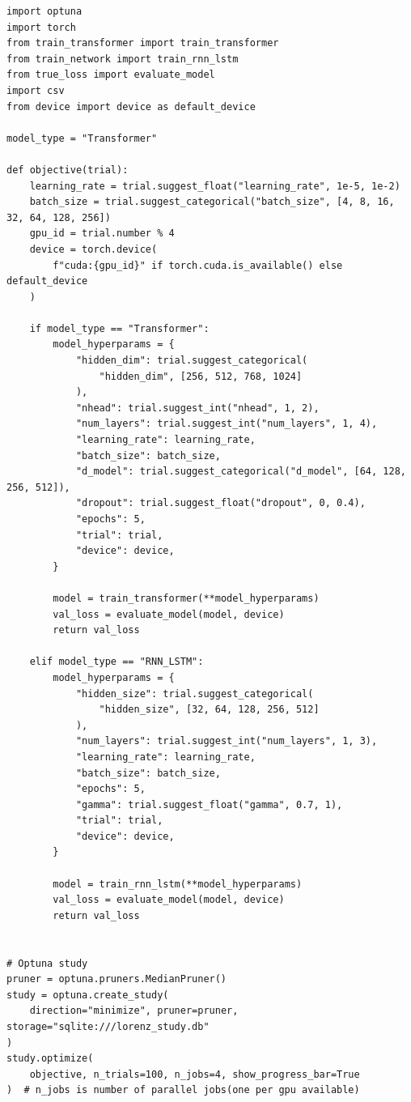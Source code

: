 \documentclass[11pt]{article}
\begin{document}
\begin{lstlisting}
import optuna
import torch
from train_transformer import train_transformer
from train_network import train_rnn_lstm
from true_loss import evaluate_model
import csv
from device import device as default_device

model_type = "Transformer"

def objective(trial):
    learning_rate = trial.suggest_float("learning_rate", 1e-5, 1e-2)
    batch_size = trial.suggest_categorical("batch_size", [4, 8, 16, 32, 64, 128, 256])
    gpu_id = trial.number % 4
    device = torch.device(
        f"cuda:{gpu_id}" if torch.cuda.is_available() else default_device
    )

    if model_type == "Transformer":
        model_hyperparams = {
            "hidden_dim": trial.suggest_categorical(
                "hidden_dim", [256, 512, 768, 1024]
            ),
            "nhead": trial.suggest_int("nhead", 1, 2),
            "num_layers": trial.suggest_int("num_layers", 1, 4),
            "learning_rate": learning_rate,
            "batch_size": batch_size,
            "d_model": trial.suggest_categorical("d_model", [64, 128, 256, 512]),
            "dropout": trial.suggest_float("dropout", 0, 0.4),
            "epochs": 5,
            "trial": trial,
            "device": device,
        }

        model = train_transformer(**model_hyperparams)
        val_loss = evaluate_model(model, device)
        return val_loss

    elif model_type == "RNN_LSTM":
        model_hyperparams = {
            "hidden_size": trial.suggest_categorical(
                "hidden_size", [32, 64, 128, 256, 512]
            ),
            "num_layers": trial.suggest_int("num_layers", 1, 3),
            "learning_rate": learning_rate,
            "batch_size": batch_size,
            "epochs": 5,
            "gamma": trial.suggest_float("gamma", 0.7, 1),
            "trial": trial,
            "device": device,
        }

        model = train_rnn_lstm(**model_hyperparams)
        val_loss = evaluate_model(model, device)
        return val_loss


# Optuna study
pruner = optuna.pruners.MedianPruner()
study = optuna.create_study(
    direction="minimize", pruner=pruner, storage="sqlite:///lorenz_study.db"
)
study.optimize(
    objective, n_trials=100, n_jobs=4, show_progress_bar=True
)  # n_jobs is number of parallel jobs(one per gpu available)
\end{lstlisting}
\end{document}
